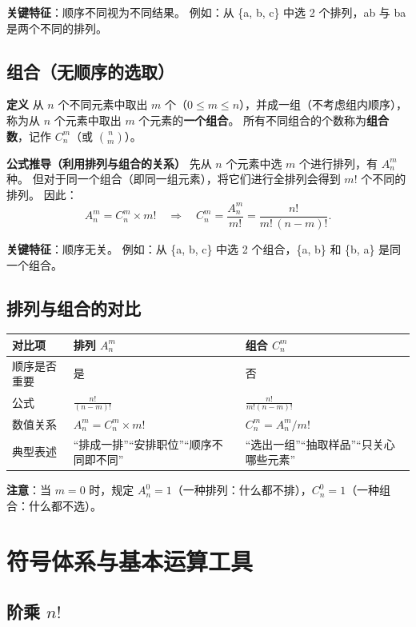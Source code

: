 \documentclass[10pt]{article}
\begin{document}
\textbf{关键特征}：顺序不同视为不同结果。
例如：从 \{a, b, c\} 中选 2 个排列，ab 与 ba 是两个不同的排列。

\subsection{组合（无顺序的选取）}

\textbf{定义}
从 \(n\) 个不同元素中取出 \(m\) 个（\(0 \le m \le n\)），并成一组（不考虑组内顺序），称为从 \(n\) 个元素中取出 \(m\) 个元素的\textbf{一个组合}。
所有不同组合的个数称为\textbf{组合数}，记作 \(C_n^m\)（或 \(\binom{n}{m}\)）。

\textbf{公式推导（利用排列与组合的关系）}
先从 \(n\) 个元素中选 \(m\) 个进行排列，有 \(A_n^m\) 种。
但对于同一个组合（即同一组元素），将它们进行全排列会得到 \(m!\) 个不同的排列。
因此：
\[
A_n^m = C_n^m \times m! \quad \Rightarrow \quad C_n^m = \frac{A_n^m}{m!} = \frac{n!}{m!\,(n-m)!}.
\]

\textbf{关键特征}：顺序无关。
例如：从 \{a, b, c\} 中选 2 个组合，\{a, b\} 和 \{b, a\} 是同一个组合。

\subsection{排列与组合的对比}

\begin{tabular}{|l|l|l|}
\hline
对比项 & 排列 \(A_n^m\) & 组合 \(C_n^m\) \\
\hline
顺序是否重要 & 是 & 否 \\
\hline
公式 & \(\frac{n!}{(n-m)!}\) & \(\frac{n!}{m!(n-m)!}\) \\
\hline
数值关系 & \(A_n^m = C_n^m \times m!\) & \(C_n^m = A_n^m / m!\) \\
\hline
典型表述 & “排成一排”“安排职位”“顺序不同即不同” & “选出一组”“抽取样品”“只关心哪些元素” \\
\hline
\end{tabular}

\textbf{注意}：当 \(m=0\) 时，规定 \(A_n^0 = 1\)（一种排列：什么都不排），\(C_n^0 = 1\)（一种组合：什么都不选）。

\section{符号体系与基本运算工具}

\subsection{阶乘 \(n!\)}
\end{document}
